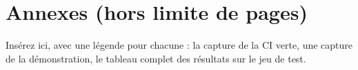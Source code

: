 \documentclass[11pt,a4paper]{article}
\begin{document}
\appendix
\section*{Annexes (hors limite de pages)}

Insérez ici, avec une légende pour chacune : la capture de la CI verte, une capture de la
démonstration, le tableau complet des résultats sur le jeu de test.

\end{document}
